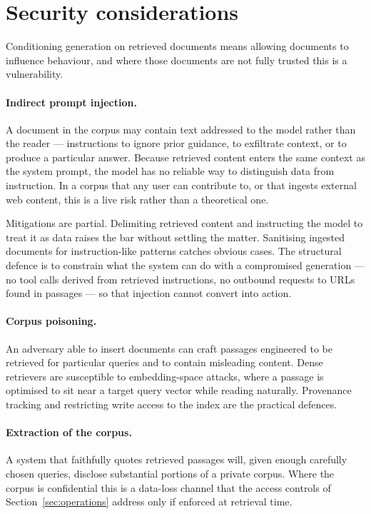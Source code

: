 \documentclass[11pt,a4paper]{article}
\begin{document}
\section{Security considerations}
\label{sec:security}

Conditioning generation on retrieved documents means allowing documents to
influence behaviour, and where those documents are not fully trusted this is a
vulnerability.

\paragraph{Indirect prompt injection.}
A document in the corpus may contain text addressed to the model rather than
the reader --- instructions to ignore prior guidance, to exfiltrate context,
or to produce a particular answer. Because retrieved content enters the same
context as the system prompt, the model has no reliable way to distinguish
data from instruction. In a corpus that any user can contribute to, or that
ingests external web content, this is a live risk rather than a theoretical
one.

Mitigations are partial. Delimiting retrieved content and instructing the
model to treat it as data raises the bar without settling the matter.
Sanitising ingested documents for instruction-like patterns catches obvious
cases. The structural defence is to constrain what the system can do with a
compromised generation --- no tool calls derived from retrieved instructions,
no outbound requests to URLs found in passages --- so that injection cannot
convert into action.

\paragraph{Corpus poisoning.}
An adversary able to insert documents can craft passages engineered to be
retrieved for particular queries and to contain misleading content. Dense
retrievers are susceptible to embedding-space attacks, where a passage is
optimised to sit near a target query vector while reading naturally. Provenance
tracking and restricting write access to the index are the practical defences.

\paragraph{Extraction of the corpus.}
A system that faithfully quotes retrieved passages will, given enough
carefully chosen queries, disclose substantial portions of a private corpus.
Where the corpus is confidential this is a data-loss channel that the access
controls of Section~\ref{sec:operations} address only if enforced at retrieval
time.
\end{document}

